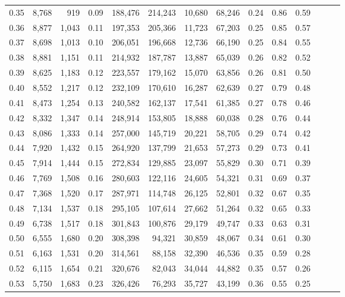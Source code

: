 \begin{tabular}{rrrrrrrrrrrrrr}
0.35 &  8,768 &    919 &  0.09 &  188,476 &  214,243 &  10,680 &  68,246 &  0.24 &  0.86 &      0.59 \\
0.36 &  8,877 &  1,043 &  0.11 &  197,353 &  205,366 &  11,723 &  67,203 &  0.25 &  0.85 &      0.57 \\
0.37 &  8,698 &  1,013 &  0.10 &  206,051 &  196,668 &  12,736 &  66,190 &  0.25 &  0.84 &      0.55 \\
0.38 &  8,881 &  1,151 &  0.11 &  214,932 &  187,787 &  13,887 &  65,039 &  0.26 &  0.82 &      0.52 \\
0.39 &  8,625 &  1,183 &  0.12 &  223,557 &  179,162 &  15,070 &  63,856 &  0.26 &  0.81 &      0.50 \\
0.40 &  8,552 &  1,217 &  0.12 &  232,109 &  170,610 &  16,287 &  62,639 &  0.27 &  0.79 &      0.48 \\
0.41 &  8,473 &  1,254 &  0.13 &  240,582 &  162,137 &  17,541 &  61,385 &  0.27 &  0.78 &      0.46 \\
0.42 &  8,332 &  1,347 &  0.14 &  248,914 &  153,805 &  18,888 &  60,038 &  0.28 &  0.76 &      0.44 \\
0.43 &  8,086 &  1,333 &  0.14 &  257,000 &  145,719 &  20,221 &  58,705 &  0.29 &  0.74 &      0.42 \\
0.44 &  7,920 &  1,432 &  0.15 &  264,920 &  137,799 &  21,653 &  57,273 &  0.29 &  0.73 &      0.41 \\
0.45 &  7,914 &  1,444 &  0.15 &  272,834 &  129,885 &  23,097 &  55,829 &  0.30 &  0.71 &      0.39 \\
0.46 &  7,769 &  1,508 &  0.16 &  280,603 &  122,116 &  24,605 &  54,321 &  0.31 &  0.69 &      0.37 \\
0.47 &  7,368 &  1,520 &  0.17 &  287,971 &  114,748 &  26,125 &  52,801 &  0.32 &  0.67 &      0.35 \\
0.48 &  7,134 &  1,537 &  0.18 &  295,105 &  107,614 &  27,662 &  51,264 &  0.32 &  0.65 &      0.33 \\
0.49 &  6,738 &  1,517 &  0.18 &  301,843 &  100,876 &  29,179 &  49,747 &  0.33 &  0.63 &      0.31 \\
0.50 &  6,555 &  1,680 &  0.20 &  308,398 &   94,321 &  30,859 &  48,067 &  0.34 &  0.61 &      0.30 \\
0.51 &  6,163 &  1,531 &  0.20 &  314,561 &   88,158 &  32,390 &  46,536 &  0.35 &  0.59 &      0.28 \\
0.52 &  6,115 &  1,654 &  0.21 &  320,676 &   82,043 &  34,044 &  44,882 &  0.35 &  0.57 &      0.26 \\
0.53 &  5,750 &  1,683 &  0.23 &  326,426 &   76,293 &  35,727 &  43,199 &  0.36 &  0.55 &      0.25 \\

\end{tabular}

